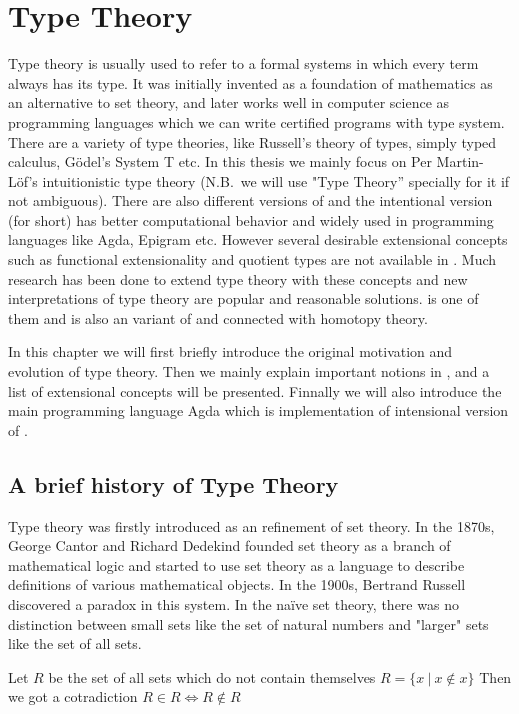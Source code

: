 \chapter{Type Theory}
\label{bg}

Type theory is usually used to refer to a formal systems in which every term always has its type. It was initially invented as a foundation of mathematics as an alternative to set theory, and later works well in computer science as programming languages which we can write certified programs with type system. There are a variety of type theories, like Russell's theory of types, simply typed calculus, Gödel's System T \cite{gdl:1931} etc. In this thesis we mainly focus on Per Martin-L\"{o}f's intuitionistic type theory (N.B.\ we will use "Type Theory'' specially for it if not ambiguous). There are also different versions of \mltt and the intentional version (\itt for short) has better computational behavior and widely used in programming languages like Agda, Epigram etc. However several desirable extensional concepts such as functional extensionality and quotient types are not available in \itt. Much research has been done to extend type theory with these concepts and new interpretations of type theory are popular and reasonable solutions. \hott is one of them and is also an variant of \mltt and connected with homotopy theory. 

In this chapter we will first briefly introduce the original motivation and evolution of type theory. Then we mainly explain important notions in \mltt, and a list of extensional concepts will be presented. Finnally we will also introduce the main programming language Agda which is implementation of intensional version of \mltt.


\section{A brief history of Type Theory}

Type theory was firstly introduced as an refinement of set theory. 
In the 1870s, George Cantor and Richard Dedekind founded set theory as a branch of mathematical logic and started to use set theory as a language to describe definitions of various mathematical objects.
In the 1900s, Bertrand Russell discovered a paradox in this system. In the naïve set theory, there was no distinction between small sets like the set of natural numbers and "larger" sets like the set of all sets.

\begin{example}
Let $R$ be the set of all sets which do not contain themselves
$R = \{x ~| ~x \not\in  x\}$
Then we got a cotradiction
$R \in R \iff R \not\in R$
\end{example}

